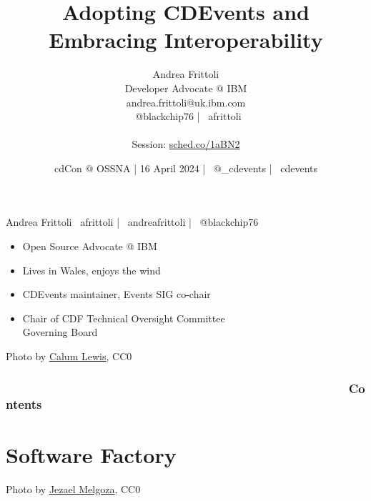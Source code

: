 \documentclass[aspectratio=169,11pt,hyperref={colorlinks=true}]{beamer}
\title{Adopting CDEvents and Embracing Interoperability}
\date[16 April 2024]{cdCon @ OSSNA | 16 April 2024 | \faTwitter ~@\_cdevents | \faGithub ~cdevents}
\author[Andrea Frittoli]{%
  Andrea Frittoli \\
  Developer Advocate @ IBM\\
  andrea.frittoli@uk.ibm.com \\
  \faTwitter ~@blackchip76 | \faGithub ~afrittoli\\
  ~\\
  Session: \href{https://sched.co/1aBN2}{sched.co/1aBN2}
}
\begin{document}
\begin{frame}
\titlepage{}
\end{frame}

\begin{speakerframe}{Andrea Frittoli}%
  {%
  \faGithub ~afrittoli | \faLinkedin ~andreafrittoli | \faTwitter ~@blackchip76
  }%
  {%
  \begin{itemize}
    \item{Open Source Advocate @ IBM}
    \item{Lives in Wales, enjoys the wind}
    \item{CDEvents maintainer, Events SIG co-chair}
    \item{Chair of CDF Technical Oversight Committee \\ Governing Board}
  \end{itemize}
  }%
\end{speakerframe}

\begin{lpicrblack}{%
  Photo by \href{https://unsplash.com/@calumlewis}{\underline{Calum Lewis}}, CC0
  }%
  {%
  \tableofcontents
  }%
  {}
  \frametitle{~~~~~~~~~~~~~~~~~~~~~~~~~~~~~~~~~~~~~~~~~~~~~~~~~~~Contents}
\end{lpicrblack}

\section[Software Factory]{Software Factory}

\begin{sectionwithpiclargecentral}{Photo by \href{https://unsplash.com/@jezar}{\underline{Jezael Melgoza}}, CC0}
\end{sectionwithpiclargecentral}
\end{document}
